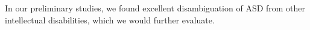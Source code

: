 \documentclass[onecolumn, compsoc,11pt]{IEEEtran}
\makeatletter
\renewcommand\subsection{\@startsection {subsection}{2}{\z@}%
                                   {0ex \@plus -1.75ex \@minus -1.2ex}%
                                   {0ex \@plus.0ex}%
                                   {\fontsize{11}{11}\selectfont\bfseries\sffamily\color{black}}}
\makeatother
\begin{document}
%
%
%
In our preliminary studies, we  found excellent disambiguation of ASD from other intellectual disabilities, which we would further evaluate.
%
 




\end{document}

